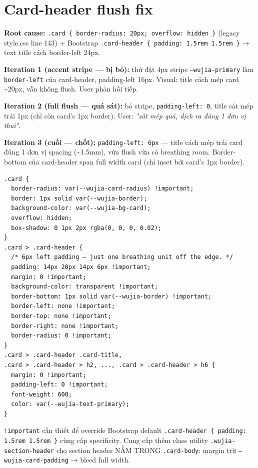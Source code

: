 \section{Card-header flush fix}

\textbf{Root cause:} \texttt{.card \{ border-radius: 20px; overflow: hidden \}} (legacy style.css line 143) + Bootstrap \texttt{.card-header \{ padding: 1.5rem 1.5rem \}} → text title cách border-left 24px.

\textbf{Iteration 1 (accent stripe — bị bỏ):} thử đặt 4px stripe \texttt{--wujia-primary} làm \texttt{border-left} của card-header, padding-left 16px. Visual: title cách mép card \textasciitilde 20px, vẫn không flush. User phản hồi tiếp.

\textbf{Iteration 2 (full flush — quá sát):} bỏ stripe, \texttt{padding-left: 0}, title sát mép trái 1px (chỉ còn card's 1px border). User: \emph{"sát mép quá, dịch ra đúng 1 đơn vị thui"}.

\textbf{Iteration 3 (cuối — chốt):} \texttt{padding-left: 6px} --- title cách mép trái card đúng 1 đơn vị spacing (\textasciitilde 1.5mm), vừa flush vừa có breathing room. Border-bottom của card-header span full width card (chỉ inset bởi card's 1px border).

\begin{lstlisting}[style=xml]
.card {
  border-radius: var(--wujia-card-radius) !important;
  border: 1px solid var(--wujia-border);
  background-color: var(--wujia-bg-card);
  overflow: hidden;
  box-shadow: 0 1px 2px rgba(0, 0, 0, 0.02);
}
.card > .card-header {
  /* 6px left padding — just one breathing unit off the edge. */
  padding: 14px 20px 14px 6px !important;
  margin: 0 !important;
  background-color: transparent !important;
  border-bottom: 1px solid var(--wujia-border) !important;
  border-left: none !important;
  border-top: none !important;
  border-right: none !important;
  border-radius: 0 !important;
}
.card > .card-header .card-title,
.card > .card-header > h2, ..., .card > .card-header > h6 {
  margin: 0 !important;
  padding-left: 0 !important;
  font-weight: 600;
  color: var(--wujia-text-primary);
}
\end{lstlisting}

\texttt{!important} cần thiết để override Bootstrap default \texttt{.card-header \{ padding: 1.5rem 1.5rem \}} cùng cấp specificity. Cung cấp thêm class utility \texttt{.wujia-section-header} cho section header NẰM TRONG \texttt{.card-body}: margin trừ \texttt{--wujia-card-padding} → bleed full width.

